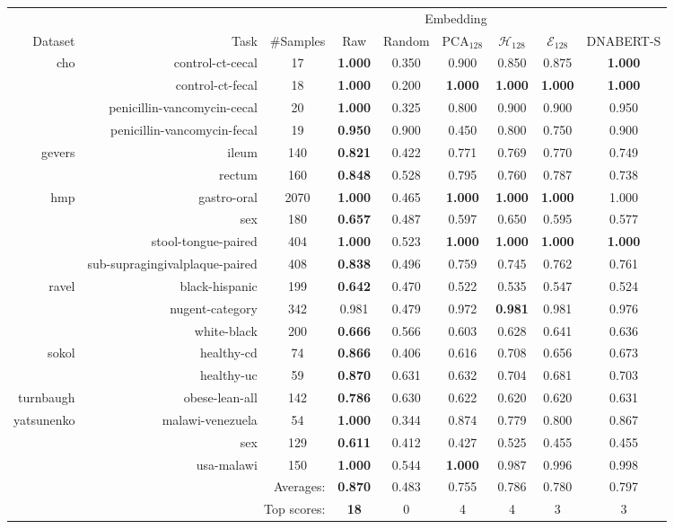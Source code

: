 \begin{tabular}{rrccccccc}
\toprule
& & & \multicolumn{5}{c}{Embedding} \\
Dataset& Task& \#Samples& Raw& Random &  PCA$_{128}$& $\mathcal{H}_{128}$& $\mathcal{E}_{128}$& DNABERT-S\\
\midrule
\multirow{4}{*}{cho}
& control-ct-cecal & 17 & \textbf{1.000} & 0.350 & 0.900 & 0.850 & 0.875 & \textbf{1.000} \\
& control-ct-fecal & 18 & \textbf{1.000} & 0.200 & \textbf{1.000} & \textbf{1.000} & \textbf{1.000} & \textbf{1.000} \\
& penicillin-vancomycin-cecal & 20 & \textbf{1.000} & 0.325 & 0.800 & 0.900 & 0.900 & 0.950 \\
& penicillin-vancomycin-fecal & 19 & \textbf{0.950} & 0.900 & 0.450 & 0.800 & 0.750 & 0.900 \\
\midrule
\multirow{2}{*}{gevers}
& ileum & 140 & \textbf{0.821} & 0.422 & 0.771 & 0.769 & 0.770 & 0.749 \\
& rectum & 160 & \textbf{0.848} & 0.528 & 0.795 & 0.760 & 0.787 & 0.738 \\
\midrule
\multirow{4}{*}{hmp}
& gastro-oral & 2070 & \textbf{1.000} & 0.465 & \textbf{1.000} & \textbf{1.000} & \textbf{1.000} & 1.000 \\
& sex & 180 & \textbf{0.657} & 0.487 & 0.597 & 0.650 & 0.595 & 0.577 \\
& stool-tongue-paired & 404 & \textbf{1.000} & 0.523 & \textbf{1.000} & \textbf{1.000} & \textbf{1.000} & \textbf{1.000} \\
& sub-supragingivalplaque-paired & 408 & \textbf{0.838} & 0.496 & 0.759 & 0.745 & 0.762 & 0.761 \\
\midrule
\multirow{3}{*}{ravel}
& black-hispanic & 199 & \textbf{0.642} & 0.470 & 0.522 & 0.535 & 0.547 & 0.524 \\
& nugent-category & 342 & 0.981 & 0.479 & 0.972 & \textbf{0.981} & 0.981 & 0.976 \\
& white-black & 200 & \textbf{0.666} & 0.566 & 0.603 & 0.628 & 0.641 & 0.636 \\
\midrule
\multirow{2}{*}{sokol}
& healthy-cd & 74 & \textbf{0.866} & 0.406 & 0.616 & 0.708 & 0.656 & 0.673 \\
& healthy-uc & 59 & \textbf{0.870} & 0.631 & 0.632 & 0.704 & 0.681 & 0.703 \\
\midrule
\multirow{1}{*}{turnbaugh}
& obese-lean-all & 142 & \textbf{0.786} & 0.630 & 0.622 & 0.620 & 0.620 & 0.631 \\
\midrule
\multirow{3}{*}{yatsunenko}
& malawi-venezuela & 54 & \textbf{1.000} & 0.344 & 0.874 & 0.779 & 0.800 & 0.867 \\
& sex & 129 & \textbf{0.611} & 0.412 & 0.427 & 0.525 & 0.455 & 0.455 \\
& usa-malawi & 150 & \textbf{1.000} & 0.544 & \textbf{1.000} & 0.987 & 0.996 & 0.998 \\
\midrule
\multicolumn{3}{r}{Averages:} & \textbf{0.870}& 0.483& 0.755& 0.786& 0.780& 0.797\\
\multicolumn{3}{r}{Top scores:} & \textbf{18}& 0& 4& 4& 3& 3\\
\bottomrule
\end{tabular}